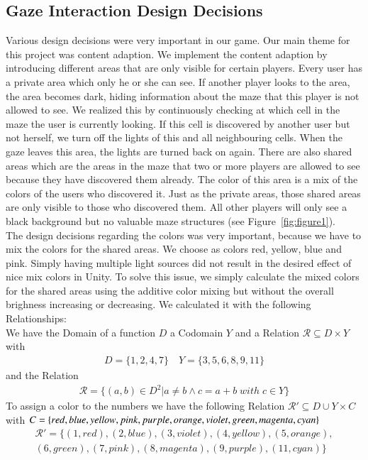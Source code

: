 \documentclass{sigchi}
\begin{document}
\subsection{Gaze Interaction Design Decisions}
Various design decisions were very important in our game. Our main theme for this project was content adaption. We implement the content adaption by introducing different areas that are only visible for certain players. Every user has a private area which only he or she can see. If another player looks to the area, the area becomes dark, hiding information about the maze that this player is not allowed to see. We realized this by continuously checking at which cell in the maze the user is currently looking. If this cell is discovered by another user but not herself, we turn off the lights of this and all neighbouring cells. When the gaze leaves this area, the lights are turned back on again. There are also shared areas which are the areas in the maze that two or more players are allowed to see because they have discovered them already. The color of this area is a mix of the colors of the users who discovered it. Just as the private areas, those shared areas are only visible to those who discovered them. All other players will only see a black background but no valuable maze structures  (see Figure~\ref{fig:figure1}).\\ 
The design decisions regarding the colors was very important, because we have to mix the colors for the shared areas. We choose as colors red, yellow, blue and pink. Simply having multiple light sources did not result in the desired effect of nice mix colors in Unity. To solve this issue, we simply calculate the mixed colors for the shared areas using the additive color mixing but without the overall brighness increasing or decreasing. We calculated it with the following Relationships: \\
We have the Domain of a function $D$ a Codomain $Y$ and a Relation $\mathcal{R} \subseteq D \times Y$ with 
\begin{align*} D = \{1,2,4,7\}   \quad Y = \{3,5,6,8,9,11\} \end{align*} and the Relation \begin{align*} \mathcal{R} = \{(a,b) \in  D^2 | a \neq b \wedge c=a+b \; with\; c \in Y \} \end{align*}
To assign a color to the numbers we have the following Relation $\mathcal{R}' \subseteq D \cup Y \times C$ with $ C= \{red, blue, yellow, pink, purple, orange, violet, green, \\magenta, cyan\} $
\begin{align*} \mathcal{R}' = \{(1,red),(2,blue),(3,violet), (4,yellow), (5,orange), \\ (6,green), (7,pink), (8,magenta), (9,purple), (11,cyan)\} \end{align*}
\end{document}
